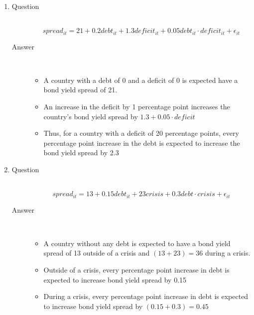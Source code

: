 \documentclass{article}
\begin{document}
\begin{enumerate}
  \item
  \begin{description}
    \item[Question] \hfill \\
    \[spread_{it} = 21 + 0.2debt_{it} + 1.3deficit_{it} + 0.05debt_{it} \cdot deficit_{it} + \epsilon_{it}\]
    \item[Answer] \hfill \\
    \begin{itemize}
      \item A country with a debt of 0 and a deficit of 0 is expected have a bond yield spread of 21.
      \item An increase in the deficit by 1 percentage point increases the country's bond yield spread by \(1.3 + 0.05 \cdot deficit \) 
      \item Thus, for a country with a deficit of 20 percentage points, every percentage point increase in the debt is expected to increase the bond yield spread by 2.3
    \end{itemize}
  \end{description}
  
  \item
  \begin{description}
    \item[Question] \hfill \\
    \[ spread_{it} = 13 + 0.15debt_{it} + 23crisis + 0.3debt \cdot crisis + \epsilon_{it} \]
    \item[Answer] \hfill \\
    \begin{itemize}
      \item A country without any debt is expected to have a bond yield spread of 13 outside of a crisis and \( (13+23)=36 \) during a crisis.
      \item Outside of a crisis, every percentage point increase in debt is expected to increase bond yield spread by 0.15 
      \item During a crisis, every percentage point increase in debt is expected to increase bond yield spread by \( (0.15 + 0.3) = 0.45 \) 
    \end{itemize}
  \end{description}
  

\end{enumerate}
\end{document}
